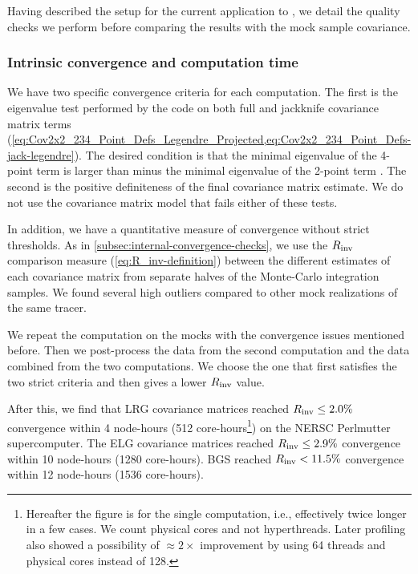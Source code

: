 Having described the setup for the current \rascalc{} application to \ezmocks{}, we detail the quality checks we perform before comparing the results with the mock sample covariance.

\subsubsection{Intrinsic convergence and computation time}
\label{sec:runtime-intrinsic-convergence}

We have two specific convergence criteria for each \rascalc{} computation.
The first is the eigenvalue test performed by the code on both full and jackknife covariance matrix terms (\cref{eq:Cov2x2_234_Point_Defs_Legendre_Projected,eq:Cov2x2_234_Point_Defs-jack-legendre}).
The desired condition is that the minimal eigenvalue of the 4-point term is larger than minus the minimal eigenvalue of the 2-point term \citep{rascalC}.
The second is the positive definiteness of the final covariance matrix estimate.
We do not use the covariance matrix model that fails either of these tests.

In addition, we have a quantitative measure of convergence without strict thresholds.
As in \cref{subsec:internal-convergence-checks}, we use the $R_{\rm inv}$ comparison measure (\cref{eq:R_inv-definition}) between the different estimates of each \rascalc{} covariance matrix from separate halves of the Monte-Carlo integration samples.
We found several high outliers compared to other mock realizations of the same tracer.

We repeat the computation on the mocks with the convergence issues mentioned before.
Then we post-process the data from the second computation and the data combined from the two computations.
We choose the one that first satisfies the two strict criteria and then gives a lower $R_{\rm inv}$ value.

After this, we find that LRG covariance matrices reached $R_{\rm inv} \le 2.0\%$ convergence within 4 node-hours (512 core-hours\footnote{Hereafter the figure is for the single computation, i.e., effectively twice longer in a few cases. We count physical cores and not hyperthreads. Later profiling also showed a possibility of $\approx 2\times$ improvement by using 64 threads and physical cores instead of 128.}) on the NERSC Perlmutter supercomputer.
The ELG covariance matrices reached $R_{\rm inv} \le 2.9\%$ convergence within 10 node-hours (1280 core-hours).
BGS reached $R_{\rm inv} < 11.5\%$ convergence within 12 node-hours (1536 core-hours).

